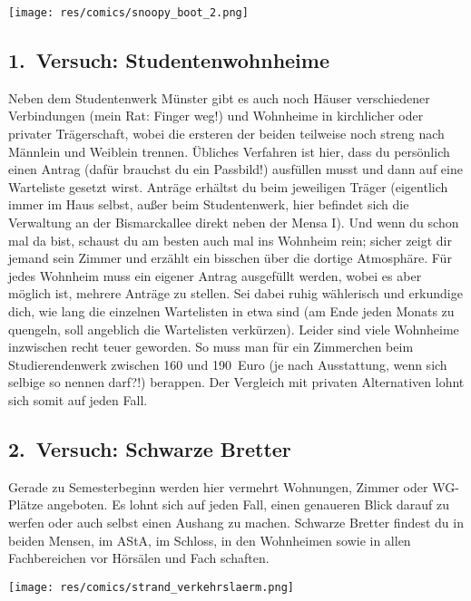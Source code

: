 \begin{multicols*}{2}
\begin{center}
\texttt{[image: res/comics/snoopy\_boot\_2.png]}
\end{center}

\subsection*{1.\ Versuch: Studentenwohnheime}
Neben dem Studentenwerk Münster gibt es auch noch Häuser verschiedener Verbindungen (mein Rat: Finger weg!) und Wohnheime in kirchlicher oder privater Trägerschaft, wobei die ersteren der beiden teilweise noch streng nach Männlein und Weiblein trennen. Übliches Verfahren ist hier, dass du persönlich einen Antrag (dafür brauchst du ein Passbild!) ausfüllen musst und dann auf eine Warteliste gesetzt wirst. Anträge erhältst du beim jeweiligen Träger (eigentlich immer im Haus selbst, außer beim Studentenwerk, hier befindet sich die Verwaltung an der Bismarckallee direkt neben der Mensa I). Und wenn du schon mal da bist, schaust du am besten auch mal ins Wohnheim rein; sicher zeigt dir jemand sein Zimmer und erzählt ein bisschen über die dortige Atmosphäre. Für jedes Wohnheim muss ein eigener Antrag ausgefüllt werden, wobei es aber möglich ist, mehrere Anträge zu stellen. Sei dabei ruhig wählerisch und erkundige dich, wie lang die einzelnen Wartelisten in etwa sind (am Ende jeden Monats zu quengeln, soll angeblich die Wartelisten verkürzen). Leider sind viele Wohnheime inzwischen recht teuer geworden. So muss man für ein Zimmerchen beim Studierendenwerk zwischen 160 und 190~Euro (je nach Ausstattung, wenn sich selbige so nennen darf?!) berappen. Der Vergleich mit privaten Alternativen lohnt sich somit auf jeden Fall.

\subsection*{2.\ Versuch: Schwarze Bretter}
Gerade zu Semesterbeginn werden hier vermehrt Wohnungen, Zimmer oder WG-Plätze angeboten. Es lohnt sich auf jeden Fall, einen genaueren Blick darauf zu werfen oder auch selbst einen Aushang zu machen. Schwarze Bretter findest du in beiden Mensen, im AStA, im Schloss, in den Wohnheimen sowie in allen Fachbereichen vor Hörsälen und Fach schaften.

\begin{center}
\texttt{[image: res/comics/strand\_verkehrslaerm.png]}
\end{center}


\end{multicols*}
